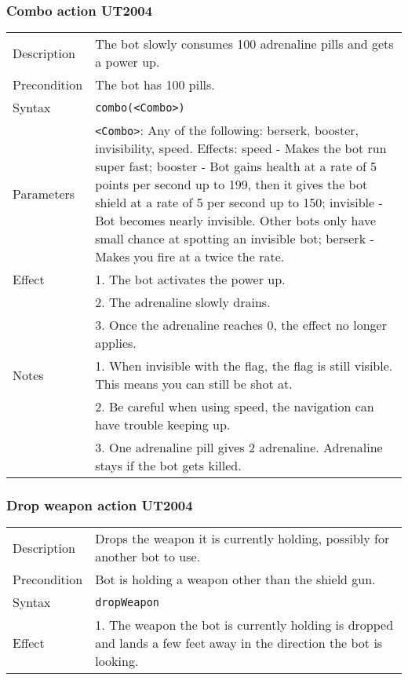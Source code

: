 \documentclass[11pt,a4paper]{article}
\begin{document}
\subsubsection*{Combo action UT2004}
%
\begin{small}
\begin{tabular}{p{2cm}p{9cm}}
Description & The bot slowly consumes 100 adrenaline pills and gets a power up.\\
Precondition & The bot has 100 pills.\\
Syntax & \verb|combo(<Combo>)|\\
Parameters & \verb|<Combo>|: Any of the following: berserk, booster, invisibility, speed.  Effects: speed - Makes the bot run super fast; booster - Bot gains health at a rate of 5 points per second up to 199, then it gives the bot shield at a rate of 5 per second up to 150; invisible - Bot becomes nearly invisible. Other bots only have small chance at spotting an invisible bot; berserk - Makes you fire at a twice the rate. \\
Effect & 
	1.	The bot activates the power up.\\
&	2.	The adrenaline slowly drains.\\
&	3.	Once the adrenaline reaches 0, the effect no longer applies.\\
Notes &
	1.	When invisible with the flag, the flag is still visible. This means you can still be shot at.\\
&	2.	Be careful when using speed, the navigation can have trouble keeping up.\\
& 3. One adrenaline pill gives 2 adrenaline. Adrenaline stays if the bot gets killed.
\end{tabular}
\end{small}


\subsubsection*{Drop weapon action UT2004}
\begin{small}
\begin{tabular}{p{2cm}p{9cm}}
Description & Drops the weapon it is currently holding, possibly for another bot to use.\\
Precondition & Bot is holding a weapon other than the shield gun.\\
Syntax & \verb|dropWeapon|\\
Effect & 
	1.	The weapon the bot is currently holding is dropped and lands a few feet away in the direction the bot is looking.
\end{tabular}
\end{small}
\end{document}
